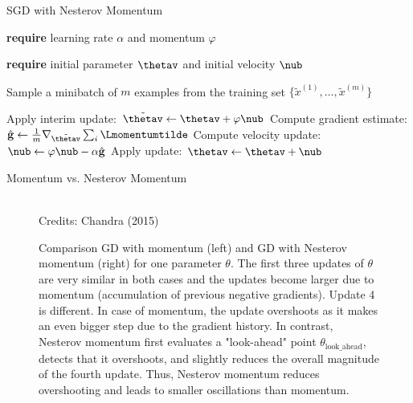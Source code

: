 \begin{vbframe}{SGD with Nesterov Momentum}
  \begin{algorithm}[H]
  \small
    \caption{Stochastic gradient descent with Nesterov momentum}
    \begin{algorithmic}[1]
    \State \textbf{require} learning rate $\alpha$ and momentum $\varphi$ \strut
    \State \textbf{require} initial parameter $\thetav$ and initial velocity $\nub$ \strut
        \State \parbox[t]{\dimexpr\linewidth-\algorithmicindent}{Sample a minibatch of $m$ examples from the training set $\{\tilde{x}^{(1)},\dots,\tilde{x}^{(m)}\}$}
        \State Apply interim update: $\tilde{\thetav} \leftarrow \thetav + \varphi \nub$
        \State Compute gradient estimate: $\hat{\mathbf{g}} \leftarrow  \frac{1}{m} \nabla_{\tilde{\thetav}} \sum_{i} \Lmomentumtilde$
        \State Compute velocity update: $\nub \leftarrow \varphi \nub - \alpha \hat{\mathbf{g}}$
        \State Apply update: $\thetav \leftarrow \thetav + \nub$
      \EndWhile
    \end{algorithmic}
  \end{algorithm}
\end{vbframe}


\begin{vbframe}{Momentum vs. Nesterov Momentum}
  \begin{figure}
   \vspace{-0.3cm}
  \captionsetup{font=footnotesize,labelfont=footnotesize, labelfont = bf}
    \centering
      \tiny{\\Credits: Chandra (2015)}
      \caption{\footnotesize{Comparison GD with momentum (left) and GD with Nesterov momentum (right) for one parameter $\theta$. The first three updates of $\theta$ are very similar in both cases and the updates become larger due to momentum (accumulation of previous negative gradients). Update 4 is different. In case of momentum, the update overshoots as it makes an even bigger step due to the gradient history. In contrast, Nesterov momentum first evaluates a "look-ahead" point $\theta_{\text{look\_ahead}}$, detects that it overshoots, and slightly reduces the overall magnitude of the fourth update. Thus, Nesterov momentum reduces overshooting and leads to smaller oscillations than momentum. }}
    \end{figure}
\end{vbframe}

